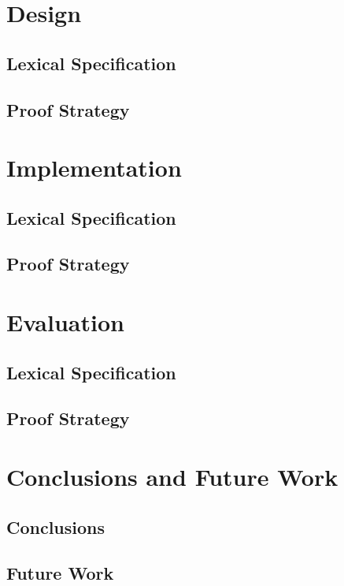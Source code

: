 \documentclass{l4proj}
\begin{document}
\chapter{Design}

\section{Lexical Specification}

\section{Proof Strategy}

\chapter{Implementation}

\section{Lexical Specification}

\section{Proof Strategy}

\chapter{Evaluation}

\section{Lexical Specification}

\section{Proof Strategy}

\chapter{Conclusions and Future Work}

\section{Conclusions}

\section{Future Work}
\end{document}
